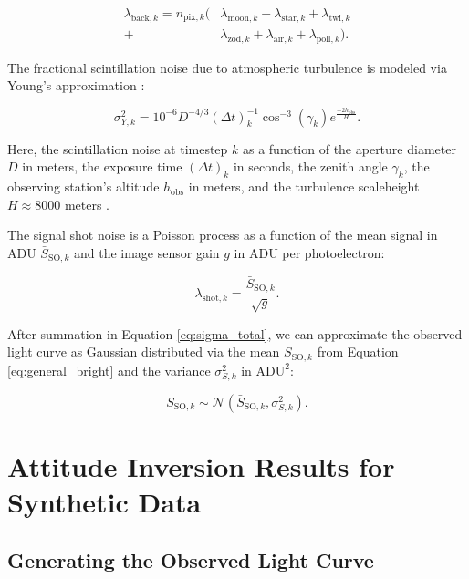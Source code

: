 \documentclass[a4paper,twocolumn]{spaceDebrisC} %
\begin{document}
\begin{equation}
  \begin{split}
  \lambda_{\text{back},k} = n_{\text{pix},k} ( &\lambda_{\text{moon},k} + \lambda_{\text{star},k} + \lambda_{\text{twi},k} \\+ &\lambda_{\text{zod},k} + \lambda_{\text{air},k} + \lambda_{\text{poll},k} ).
  \end{split}
\end{equation}

The fractional scintillation noise due to atmospheric turbulence is modeled via Young's approximation \cite{osborn2015}:

\begin{equation} \label{eq:scint_noise}
  \sigma^2_{Y,k} = 10^{-6} D^{-4/3} (\Delta t)_k^{-1} \cos^{-3}\left(\gamma_k\right) e^{\frac{-2h_\text{obs}}{H}}.
\end{equation}

Here, the scintillation noise at timestep $k$ as a function of the aperture diameter $D$ in meters, the exposure time $(\Delta t)_k$ in seconds, the zenith angle $\gamma_k$, the observing station's altitude $h_\text{obs}$ in meters, and the turbulence scaleheight $H\approx8000$ meters \cite{osborn2015}.

The signal shot noise is a Poisson process as a function of the mean signal in ADU $\bar{S}_{\text{SO},k}$ and the image sensor gain $g$ in ADU per photoelectron:

\begin{equation}
  \lambda_{\text{shot},k} = \frac{\bar{S}_{\text{SO},k}}{\sqrt{g}}.
\end{equation}

After summation in Equation \ref{eq:sigma_total}, we can approximate the observed light curve as Gaussian distributed via the mean $\bar{S}_{\text{SO},k}$ from Equation \ref{eq:general_bright} and the variance $\sigma^2_{S,k}$ in $\text{ADU}^2$:

\begin{equation} \label{eq:lc_dist}
 S_{\text{SO},k} \sim \mathcal{N}\left( \bar{S}_{\text{SO},k}, \sigma^2_{S,k} \right).
 \end{equation}

\section{Attitude Inversion Results for Synthetic Data}

\subsection{Generating the Observed Light Curve}
\end{document}
